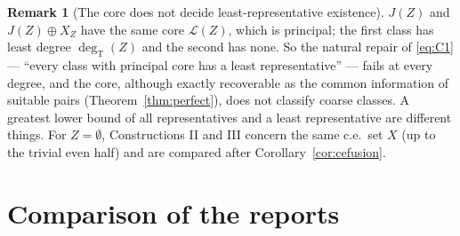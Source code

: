 \documentclass[11pt,letterpaper]{article}
\theoremstyle{definition}
\newtheorem{remark}[definition]{Remark}
\numberwithin{equation}{section}
\newcommand{\Low}{\mathcal L}
\newcommand{\degT}{\deg_{\mathrm T}}
\newcommand{\J}{J}
\newcommand{\src}[1]{\leavevmode{\sffamily\footnotesize\color{Steel}[#1]}}
\begin{document}
\begin{remark}[The core does not decide least-representative existence]\label{rem:principalcore}\src{R8}
$\J(Z)$ and $\J(Z)\oplus X_Z$ have the same core $\Low(Z)$, which is principal; the first class has least degree $\degT(Z)$ and the second has none. So the natural repair of \eqref{eq:C1} --- ``every class with principal core has a least representative'' --- fails at every degree, and the core, although exactly recoverable as the common information of suitable pairs (Theorem~\ref{thm:perfect}), does not classify coarse classes. A greatest lower bound of all representatives and a least representative are different things. For $Z=\emptyset$, Constructions II and III concern the same c.e.\ set $X$ (up to the trivial even half) and are compared after Corollary~\ref{cor:cefusion}.
\end{remark}

\section{Comparison of the reports}\label{sec:comparison}
\end{document}
